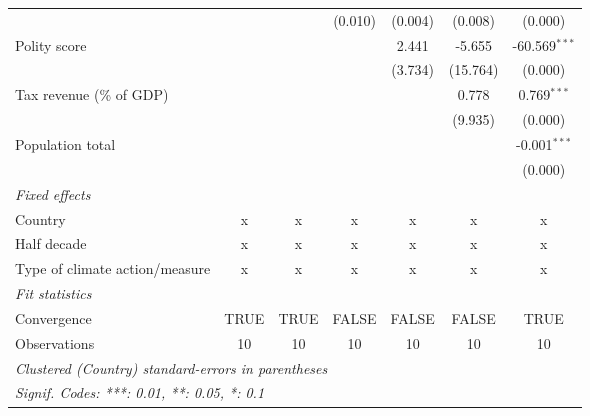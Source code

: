 \begin{tabular}{lcccccc}
                                                                          &          &                 & (0.010)       & (0.004)           & (0.008)       & (0.000)\\   
   Polity score                                                           &          &                 &               & 2.441             & -5.655        & -60.569$^{***}$\\   
                                                                          &          &                 &               & (3.734)           & (15.764)      & (0.000)\\   
   Tax revenue (\% of GDP)                                                &          &                 &               &                   & 0.778         & 0.769$^{***}$\\   
                                                                          &          &                 &               &                   & (9.935)       & (0.000)\\   
   Population total                                                       &          &                 &               &                   &               & -0.001$^{***}$\\   
                                                                          &          &                 &               &                   &               & (0.000)\\   
   \emph{Fixed effects}\\
   Country                                                                & x        & x               & x             & x                 & x             & x\\  
   Half decade                                                            & x        & x               & x             & x                 & x             & x\\  
   Type of climate action/measure                                         & x        & x               & x             & x                 & x             & x\\  
   \midrule \emph{Fit statistics}\\
   Convergence                                                            &TRUE      & TRUE            & FALSE         & FALSE             & FALSE         & TRUE\\  
   Observations                                                           & 10       & 10              & 10            & 10                & 10            & 10\\  
   \midrule
   \multicolumn{7}{l}{\emph{Clustered (Country) standard-errors in parentheses}}\\
   \multicolumn{7}{l}{\emph{Signif. Codes: ***: 0.01, **: 0.05, *: 0.1}}\\
\end{tabular}
\par\endgroup


